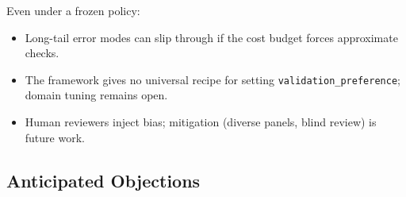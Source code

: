 \documentclass[11pt]{article}
\begin{document}
Even under a frozen policy:

\begin{itemize}\itemsep=2pt
\item Long-tail error modes can slip through if the cost budget forces approximate checks.
\item The framework gives no universal recipe for setting \verb|validation_preference|; domain tuning remains open.
\item Human reviewers inject bias; mitigation (diverse panels, blind review) is future work.
\end{itemize}

\subsection{\quad Anticipated Objections}
\label{sec:objections}
\end{document}
